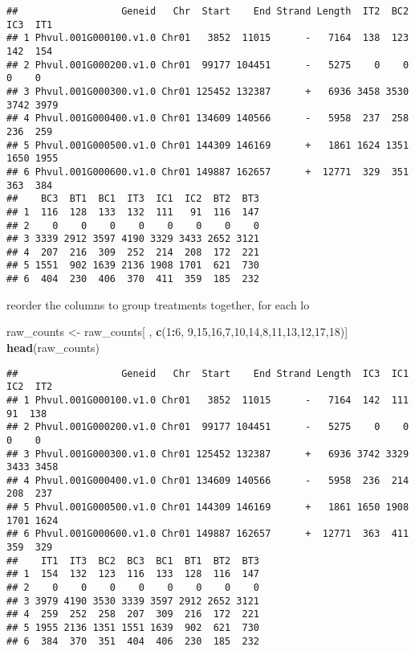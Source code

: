 \documentclass[
]{article}
\newenvironment{Shaded}{\begin{snugshade}}{\end{snugshade}}
\newcommand{\DecValTok}[1]{\textcolor[rgb]{0.00,0.00,0.81}{#1}}
\newcommand{\KeywordTok}[1]{\textcolor[rgb]{0.13,0.29,0.53}{\textbf{#1}}}
\newcommand{\NormalTok}[1]{#1}
\newcommand{\OperatorTok}[1]{\textcolor[rgb]{0.81,0.36,0.00}{\textbf{#1}}}
\newcommand{\StringTok}[1]{\textcolor[rgb]{0.31,0.60,0.02}{#1}}
\begin{document}
\begin{verbatim}
##                  Geneid   Chr  Start    End Strand Length  IT2  BC2  IC3  IT1
## 1 Phvul.001G000100.v1.0 Chr01   3852  11015      -   7164  138  123  142  154
## 2 Phvul.001G000200.v1.0 Chr01  99177 104451      -   5275    0    0    0    0
## 3 Phvul.001G000300.v1.0 Chr01 125452 132387      +   6936 3458 3530 3742 3979
## 4 Phvul.001G000400.v1.0 Chr01 134609 140566      -   5958  237  258  236  259
## 5 Phvul.001G000500.v1.0 Chr01 144309 146169      +   1861 1624 1351 1650 1955
## 6 Phvul.001G000600.v1.0 Chr01 149887 162657      +  12771  329  351  363  384
##    BC3  BT1  BC1  IT3  IC1  IC2  BT2  BT3
## 1  116  128  133  132  111   91  116  147
## 2    0    0    0    0    0    0    0    0
## 3 3339 2912 3597 4190 3329 3433 2652 3121
## 4  207  216  309  252  214  208  172  221
## 5 1551  902 1639 2136 1908 1701  621  730
## 6  404  230  406  370  411  359  185  232
\end{verbatim}

reorder the columns to group treatments together, for each lo

\begin{Shaded}
\begin{Highlighting}[]
\NormalTok{raw_counts <-}\StringTok{ }\NormalTok{raw_counts[ , }\KeywordTok{c}\NormalTok{(}\DecValTok{1}\OperatorTok{:}\DecValTok{6}\NormalTok{, }\DecValTok{9}\NormalTok{,}\DecValTok{15}\NormalTok{,}\DecValTok{16}\NormalTok{,}\DecValTok{7}\NormalTok{,}\DecValTok{10}\NormalTok{,}\DecValTok{14}\NormalTok{,}\DecValTok{8}\NormalTok{,}\DecValTok{11}\NormalTok{,}\DecValTok{13}\NormalTok{,}\DecValTok{12}\NormalTok{,}\DecValTok{17}\NormalTok{,}\DecValTok{18}\NormalTok{)]}
\KeywordTok{head}\NormalTok{(raw_counts)}
\end{Highlighting}
\end{Shaded}

\begin{verbatim}
##                  Geneid   Chr  Start    End Strand Length  IC3  IC1  IC2  IT2
## 1 Phvul.001G000100.v1.0 Chr01   3852  11015      -   7164  142  111   91  138
## 2 Phvul.001G000200.v1.0 Chr01  99177 104451      -   5275    0    0    0    0
## 3 Phvul.001G000300.v1.0 Chr01 125452 132387      +   6936 3742 3329 3433 3458
## 4 Phvul.001G000400.v1.0 Chr01 134609 140566      -   5958  236  214  208  237
## 5 Phvul.001G000500.v1.0 Chr01 144309 146169      +   1861 1650 1908 1701 1624
## 6 Phvul.001G000600.v1.0 Chr01 149887 162657      +  12771  363  411  359  329
##    IT1  IT3  BC2  BC3  BC1  BT1  BT2  BT3
## 1  154  132  123  116  133  128  116  147
## 2    0    0    0    0    0    0    0    0
## 3 3979 4190 3530 3339 3597 2912 2652 3121
## 4  259  252  258  207  309  216  172  221
## 5 1955 2136 1351 1551 1639  902  621  730
## 6  384  370  351  404  406  230  185  232
\end{verbatim}
\end{document}

